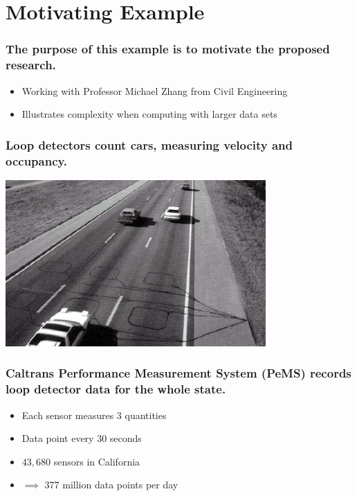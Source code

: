 \documentclass{beamer}
\begin{document}
\section{Motivating Example}
\begin{frame}

    \frametitle{The purpose of this example is to motivate the proposed
    research.}

    \begin{itemize}
        \item Working with Professor Michael Zhang from Civil Engineering
        \item Illustrates complexity when computing with larger data sets
    \end{itemize}

\end{frame}
\begin{frame}

    \frametitle{Loop detectors count cars, measuring velocity and
    occupancy.}

\centerline{\includegraphics[height=2.5in]{loop_detector.jpg}}

\end{frame}
\begin{frame}

\frametitle{Caltrans Performance Measurement System (PeMS) records loop
    detector
data for the whole state.}

    \begin{itemize}
        \item Each sensor measures 3 quantities
        \item Data point every 30 seconds
        \item $43,680$ sensors in California
        \item $\implies$  377 million data points per day
    \end{itemize}

\end{frame}
\end{document}
